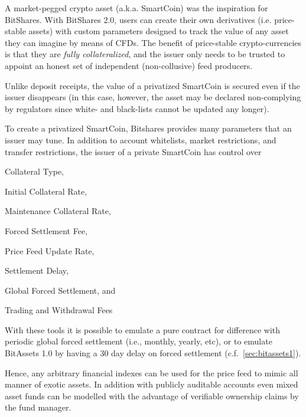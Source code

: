 \label{sec:uia:priv}

A market-pegged crypto asset (a.k.a. SmartCoin) was the inspiration for
BitShares. With BitShares 2.0, users can create their own derivatives (i.e.
price-stable assets) with custom parameters designed to track the value of any
asset they can imagine by means of CFDs. The benefit of price-stable
crypto-currencies is that they are \emph{fully collateralized}, and the issuer
only needs to be trusted to appoint an honest set of independent
(non-collusive) feed producers. 

Unlike deposit receipts, the value of a privatized SmartCoin is secured even if
the issuer disappears (in this case, however, the asset may be declared
non-complying by regulators since white- and black-lists cannot be updated any
longer).

To create a privatized SmartCoin, Bitshares provides many parameters that an
issuer may tune. In addition to account whitelists, market restrictions, and
transfer restrictions, the issuer of a private SmartCoin has control over
\begin{inparaenum}[(a)]
 \item Collateral Type,
 \item Initial Collateral Rate,
 \item Maintenance Collateral Rate,
 \item Forced Settlement Fee, 
 \item Price Feed Update Rate,
 \item Settlement Delay, %
 \item Global Forced Settlement, and
 \item Trading and Withdrawal Fees
\end{inparaenum}

With these tools it is possible to emulate a pure contract for difference with
periodic global forced settlement (i.e., monthly, yearly, etc), or to emulate
BitAssets 1.0 by having a 30 day delay on forced settlement
(c.f.~\cref{sec:bitassets1}).

Hence, any arbitrary financial indexes can be used for the price feed to mimic
all manner of exotic assets. In addition with publicly auditable accounts even
mixed asset funds can be modelled with the advantage of verifiable ownership
claims by the fund manager.

